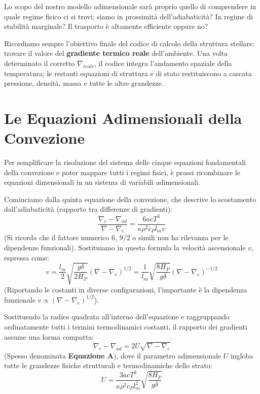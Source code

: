 Lo scopo del nostro modello adimensionale sarà proprio quello di comprendere in quale regime fisico ci si trovi: siamo in prossimità dell'adiabaticità? In regime di stabilità marginale? Il trasporto è altamente efficiente oppure no?

Ricordiamo sempre l'obiettivo finale del codice di calcolo della struttura stellare: trovare il valore del \textbf{gradiente termico reale} dell'ambiente. Una volta determinato il corretto $\nabla_{reale}$, il codice integra l'andamento spaziale della temperatura; le restanti equazioni di struttura e di stato restituiscono a cascata pressione, densità, massa e tutte le altre grandezze.

\section{Le Equazioni Adimensionali della Convezione}

Per semplificare la risoluzione del sistema delle cinque equazioni fondamentali della convezione e poter mappare tutti i regimi fisici, è prassi ricombinare le equazioni dimensionali in un sistema di variabili adimensionali.

Cominciamo dalla quinta equazione della convezione, che descrive lo scostamento dall'adiabaticità (rapporto tra differenze di gradienti):
\begin{equation}
\frac{\nabla_e - \nabla_{ad}}{\nabla - \nabla_e} = \frac{6 a c T^3}{\kappa \rho^2 c_P l_m v}
\end{equation}
(Si ricorda che il fattore numerico $6$, $9/2$ o simili non ha rilevanza per le dipendenze funzionali). Sostituiamo in questa formula la velocità ascensionale $v$, espressa come:
\begin{equation}
v = \frac{l_m}{2} \sqrt{\frac{g \delta}{2 H_P}} (\nabla - \nabla_e)^{1/2} = \frac{1}{l_m} \sqrt{\frac{8 H_P}{g \delta}} (\nabla - \nabla_e)^{-1/2}
\end{equation}
(Riportando le costanti in diverse configurazioni, l'importante è la dipendenza funzionale $v \propto (\nabla - \nabla_e)^{1/2}$).

Sostituendo la radice quadrata all'interno dell'equazione e raggruppando ordinatamente tutti i termini termodinamici costanti, il rapporto dei gradienti assume una forma compatta:
\begin{equation}
\nabla_e - \nabla_{ad} = 2 U \sqrt{\nabla - \nabla_e}
\end{equation}
(Spesso denominata \textbf{Equazione A}), dove il parametro adimensionale $U$ ingloba tutte le grandezze fisiche strutturali e termodinamiche dello strato:
\begin{equation}
U = \frac{3 a c T^3}{\kappa \rho^2 c_P l_m^2} \sqrt{\frac{8 H_P}{g \delta}}
\end{equation}


